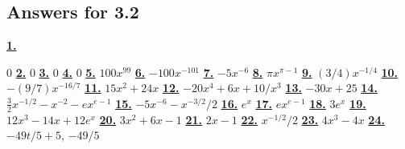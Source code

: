 \subsection *{Answers for 3.2}
\hypertarget {a:3.2.1}{\hyperlink {e:3.2.1}{\bfseries 1.}} \mdseries $0$\qquad 
\hypertarget {a:3.2.2}{\hyperlink {e:3.2.2}{\bfseries 2.}} \mdseries $0$\qquad 
\hypertarget {a:3.2.3}{\hyperlink {e:3.2.3}{\bfseries 3.}} \mdseries $0$\qquad 
\hypertarget {a:3.2.4}{\hyperlink {e:3.2.4}{\bfseries 4.}} \mdseries $0$\qquad 
\hypertarget {a:3.2.5}{\hyperlink {e:3.2.5}{\bfseries 5.}} \mdseries $100x^{99}$\qquad 
\hypertarget {a:3.2.6}{\hyperlink {e:3.2.6}{\bfseries 6.}} \mdseries $-100x^{-101}$\qquad 
\hypertarget {a:3.2.7}{\hyperlink {e:3.2.7}{\bfseries 7.}} \mdseries $-5x^{-6}$\qquad 
\hypertarget {a:3.2.8}{\hyperlink {e:3.2.8}{\bfseries 8.}} \mdseries $\pi x^{\pi -1}$\qquad 
\hypertarget {a:3.2.9}{\hyperlink {e:3.2.9}{\bfseries 9.}} \mdseries $(3/4)x^{-1/4}$\qquad 
\hypertarget {a:3.2.10}{\hyperlink {e:3.2.10}{\bfseries 10.}} \mdseries $-(9/7)x^{-16/7}$\qquad 
\hypertarget {a:3.2.11}{\hyperlink {e:3.2.11}{\bfseries 11.}} \mdseries $15x^2+24x$\qquad 
\hypertarget {a:3.2.12}{\hyperlink {e:3.2.12}{\bfseries 12.}} \mdseries $-20x^4+6x+10/x^3$\qquad 
\hypertarget {a:3.2.13}{\hyperlink {e:3.2.13}{\bfseries 13.}} \mdseries $-30x+25$\qquad 
\hypertarget {a:3.2.14}{\hyperlink {e:3.2.14}{\bfseries 14.}} \mdseries $\frac {3}{2}x^{-1/2}-x^{-2}-ex^{e-1}$\qquad 
\hypertarget {a:3.2.15}{\hyperlink {e:3.2.15}{\bfseries 15.}} \mdseries $-5x^{-6} - x^{-3/2}/2$\qquad 
\hypertarget {a:3.2.16}{\hyperlink {e:3.2.16}{\bfseries 16.}} \mdseries $e^x$\qquad 
\hypertarget {a:3.2.17}{\hyperlink {e:3.2.17}{\bfseries 17.}} \mdseries $ex^{e-1}$\qquad 
\hypertarget {a:3.2.18}{\hyperlink {e:3.2.18}{\bfseries 18.}} \mdseries $3e^x$\qquad 
\hypertarget {a:3.2.19}{\hyperlink {e:3.2.19}{\bfseries 19.}} \mdseries $12x^3-14x +12 e^x$\qquad 
\hypertarget {a:3.2.20}{\hyperlink {e:3.2.20}{\bfseries 20.}} \mdseries $3x^2+6x-1$\qquad 
\hypertarget {a:3.2.21}{\hyperlink {e:3.2.21}{\bfseries 21.}} \mdseries $2x-1 $\qquad 
\hypertarget {a:3.2.22}{\hyperlink {e:3.2.22}{\bfseries 22.}} \mdseries $x^{-1/2}/2 $\qquad 
\hypertarget {a:3.2.23}{\hyperlink {e:3.2.23}{\bfseries 23.}} \mdseries $4x^3-4x$\qquad 
\hypertarget {a:3.2.24}{\hyperlink {e:3.2.24}{\bfseries 24.}} \mdseries $-49t/5+5$, $-49/5$\qquad 

